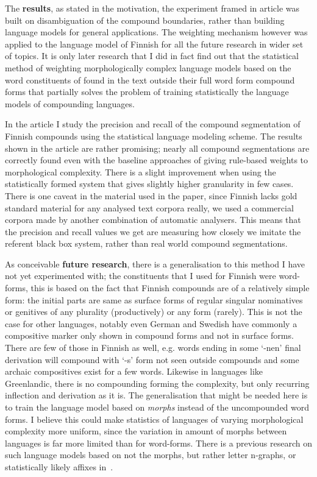 \documentclass[officiallayout]{unihelcompling}
\begin{document}
The \textbf{results}, as stated in the motivation, the experiment framed in
article was built on disambiguation of the compound boundaries, rather than
building language models for general applications. The weighting mechanism
however was applied to the language model of Finnish for all the future
research in wider set of topics. It is only later research that I did in fact
find out that the statistical method of weighting morphologically complex
language models based on the word constituents of found in the text outside
their full word form compound forms that partially solves the problem of
training statistically the language models of compounding languages.

In the article I study the precision and recall of the compound segmentation
of Finnish compounds using the statistical language modeling scheme. The
results shown in the article are rather promising; nearly all compound
segmentations are correctly found even with the baseline approaches of giving
rule-based weights to morphological complexity. There is a slight improvement
when using the statistically formed system that gives slightly higher
granularity in few cases. There is one caveat in the material used in the
paper, since Finnish lacks gold standard material for any analysed text
corpora really, we used a commercial corpora made by another combination
of automatic analysers. This means that the precision and recall values we
get are measuring how closely we imitate the referent black box system, rather
than real world compound segmentations.

As conceivable \textbf{future research}, there is a generalisation to this
method I have not yet experimented with; the constituents that I used for
Finnish were word-forms, this is based on the fact that Finnish compounds are
of a relatively simple form: the initial parts are same as surface forms of
regular singular nominatives or genitives of any plurality (productively) or
any form (rarely). This is not the case for other languages, notably even
German and Swedish have commonly a compositive marker only shown in compound
forms and not in surface forms. There are few of those in Finnish as well,
e.g.\/ words ending in some `-nen' final derivation will compound with `-s'
form not seen outside compounds and some archaic compositives exist for a few
words.  Likewise in languages like Greenlandic, there is no compounding forming
the complexity, but only recurring inflection and derivation as it is. The
generalisation that might be needed here is to train the language model based
on \emph{morphs} instead of the uncompounded word forms.  I believe this could
make statistics of languages of varying morphological complexity more uniform,
since the variation in amount of morphs between languages is far more limited
than for word-forms. There is a previous research on such language models based
on not the morphs, but rather letter n-graphs, or statistically likely affixes
in~\citet{creutz2005morfessor}.
\end{document}
